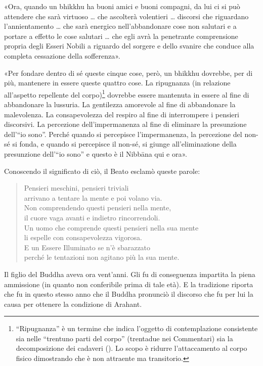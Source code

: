 «Ora, quando un bhikkhu ha buoni amici e buoni compagni, da lui ci si
può attendere che sarà virtuoso … che ascolterà volentieri … discorsi
che riguardano l’annientamento … che sarà energico nell’abbandonare cose
non salutari e a portare a effetto le cose salutari … che egli avrà la
penetrante comprensione propria degli Esseri Nobili a riguardo del
sorgere e dello svanire che conduce alla completa cessazione della
sofferenza».


«Per fondare dentro di sé queste cinque cose, però, un bhikkhu dovrebbe,
per di più, mantenere in essere queste quattro cose. La ripugnanza (in
relazione all’aspetto repellente del corpo)\footnote{“Ripugnanza” è un termine che indica l’oggetto di contemplazione consistente sia nelle “trentuno parti del corpo” (trentadue nei Commentari) sia la decomposizione dei cadaveri (\hyperlink{cap-12-La-Dottrina#pag270}{}). Lo scopo è ridurre l’attaccamento al corpo fisico dimostrando che è non attraente ma transitorio.} dovrebbe
essere mantenuta in essere al fine di abbandonare la lussuria. La
gentilezza amorevole al fine di abbandonare la malevolenza. La
consapevolezza del respiro al fine di interrompere i pensieri
discorsivi. La percezione dell’impermanenza al fine di eliminare la
presunzione dell’“io sono”. Perché quando si percepisce l’impermanenza,
la percezione del non-sé si fonda, e quando si percepisce il non-sé, si
giunge all’eliminazione della presunzione dell’“io sono” e questo è il
Nibbāna qui e ora».


Conoscendo il significato di ciò, il Beato esclamò queste parole:


\begin{quote}
Pensieri meschini, pensieri triviali \\
arrivano a tentare la mente e poi volano via. \\
Non comprendendo questi pensieri nella mente, \\
il cuore vaga avanti e indietro rincorrendoli. \\
Un uomo che comprende questi pensieri nella sua mente \\
li espelle con consapevolezza vigorosa. \\
E un Essere Illuminato se n’è sbarazzato \\
perché le tentazioni non agitano più la sua mente.
\end{quote}



 Il figlio del Buddha aveva ora vent’anni. Gli fu di
conseguenza impartita la piena ammissione (in quanto non conferibile
prima di tale età). E la tradizione riporta che fu in questo stesso anno
che il Buddha pronunciò il discorso che fu per lui la causa per ottenere
la condizione di Arahant.


